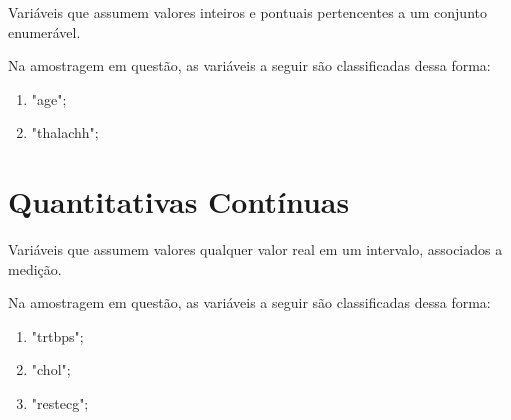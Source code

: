     Variáveis que assumem valores inteiros e pontuais pertencentes a um conjunto enumerável. 

    Na amostragem em questão, as variáveis a seguir são classificadas dessa forma: 

    \begin{enumerate}[label={\alph*)}]
        \addtolength{\itemindent}{1.25cm}
        \item "age";
        \item "thalachh";
    \end{enumerate}

    \section{Quantitativas Contínuas}

    Variáveis que assumem valores qualquer valor real em um intervalo, associados a medição. 

    Na amostragem em questão, as variáveis a seguir são classificadas dessa forma: 

    \begin{enumerate}[label={\alph*)}]
        \addtolength{\itemindent}{1.25cm}
        \item "trtbps";
        \item "chol";
        \item "restecg";
    \end{enumerate}

    \nocite{classificacao}